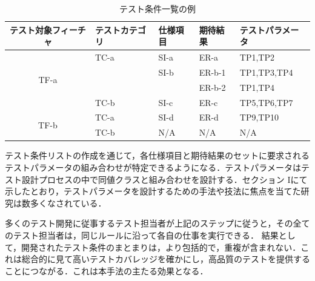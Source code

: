 \documentclass[a4paper,12pt]{jreport}
\begin{document}
\begin{table}[htbp]
  \centering
  \caption{テスト条件一覧の例}
    \begin{tabular}{|c|p{6em}|p{6em}|p{6em}|p{7.145em}|}
    \hline
    \multicolumn{1}{|p{8.855em}|}{\textbf{テスト対象フィーチャ}} & \textbf{テストカテゴリ} & \textbf{仕様項目} & \textbf{期待結果} & \textbf{テストパラメータ} \bigstrut \\
    \hline
    \multicolumn{1}{|c|}{\multirow{4}[8]{*}{TF-a}} & TC-a  & SI-a  & ER-a  & TP1,TP2 \bigstrut\\
\cline{2-5}          & \multicolumn{1}{l|}{} & SI-b  & ER-b-1 & TP1,TP3,TP4 \bigstrut\\
\cline{2-5}          & \multicolumn{1}{l|}{} & \multicolumn{1}{l|}{} & ER-b-2 & TP1,TP4 \bigstrut\\
\cline{2-5}          & TC-b  & SI-c  & ER-c  & TP5,TP6,TP7 \bigstrut\\
    \hline
    \multicolumn{1}{|c|}{\multirow{2}[4]{*}{TF-b}} & TC-a  & SI-d  & ER-d  & TP9,TP10 \bigstrut\\
\cline{2-5}          & TC-b  & N/A   & N/A   & N/A \bigstrut\\
    \hline
    \end{tabular}%
  \label{tbl:D-3-tbl3}%
\end{table}%


テスト条件リストの作成を通じて，各仕様項目と期待結果のセットに要求されるテストパラメータの組み合わせが特定できるようになる．テストパラメータはテスト設計プロセスの中で同値クラスと組み合わせを設計する．セクション Iにて示したとおり，テストパラメータを設計するための手法や技法に焦点を当てた研究は数多くなされている．

      多くのテスト開発に従事するテスト担当者が上記のステップに従うと，その全てのテスト担当者は，同じルールに沿って各自の仕事を実行できる． 結果として，開発されたテスト条件のまとまりは，より包括的で，重複が含まれない．これは総合的に見て高いテストカバレッジを確かにし，高品質のテストを提供することにつながる．これは本手法の主たる効果となる．
\end{document}
